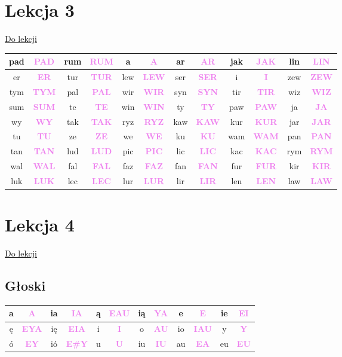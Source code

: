 \documentclass[12p, oneside]{book}
\newcommand{\steno}[1]{\textbf{\textsf{\textcolor{violet}{ #1}}}}
\begin{document}
\section{Lekcja 3}

\hyperref[prakt:3]{Do lekcji}


\label{odp:3}
\begin{tabular}{|c c|c c|c c|c c|c c|c c|}
	\hline
	pad & \steno{PAD} & rum & \steno{RUM} & a & \steno{A} & ar & \steno{AR} & jak & \steno{JAK} & lin & \steno{LIN} \\ \hline
	er & \steno{ER} & tur & \steno{TUR} & lew & \steno{LEW} & ser & \steno{SER} & i & \steno{I} & zew & \steno{ZEW} \\ \hline
	tym & \steno{TYM} & pal & \steno{PAL} & wir & \steno{WIR} & syn & \steno{SYN} & tir & \steno{TIR} & wiz & \steno{WIZ} \\ \hline
	sum & \steno{SUM} & te & \steno{TE} & win & \steno{WIN} & ty & \steno{TY} & paw & \steno{PAW} & ja & \steno{JA} \\ \hline
	wy & \steno{WY} & tak & \steno{TAK} & ryz & \steno{RYZ} & kaw & \steno{KAW} & kur & \steno{KUR} & jar & \steno{JAR} \\ \hline
	tu & \steno{TU} & ze & \steno{ZE} & we & \steno{WE} & ku & \steno{KU} & wam & \steno{WAM} & pan & \steno{PAN} \\ \hline
	tan & \steno{TAN} & lud & \steno{LUD} & pic & \steno{PIC} & lic & \steno{LIC} & kac & \steno{KAC} & rym & \steno{RYM} \\ \hline
	wal & \steno{WAL} & fal & \steno{FAL} & faz & \steno{FAZ} & fan & \steno{FAN} & fur & \steno{FUR} & kir & \steno{KIR} \\ \hline
	luk & \steno{LUK} & lec & \steno{LEC} & lur & \steno{LUR} & lir & \steno{LIR} & len & \steno{LEN} & law & \steno{LAW} \\ \hline
\end{tabular}

\section{Lekcja 4}
\hyperref[prakt:4]{Do lekcji}

\label{odp:4}
\subsection*{Głoski}
\begin{tabular}{|c c|c c|c c|c c|c c|c c|}
	\hline
	a & \steno{A} & ia & \steno{IA} & ą & \steno{EAU} & ią & \steno{YA} & e & \steno{E} & ie & \steno{EI} \\ \hline
	ę & \steno{EYA} & ię & \steno{EIA} & i & \steno{I} & o & \steno{AU} & io & \steno{IAU} & y & \steno{Y} \\ \hline
	ó & \steno{EY} & ió & \steno{E\#Y} & u & \steno{U} & iu & \steno{IU} & au & \steno{EA} & eu & \steno{EU} \\ \hline
\end{tabular}
\end{document}
